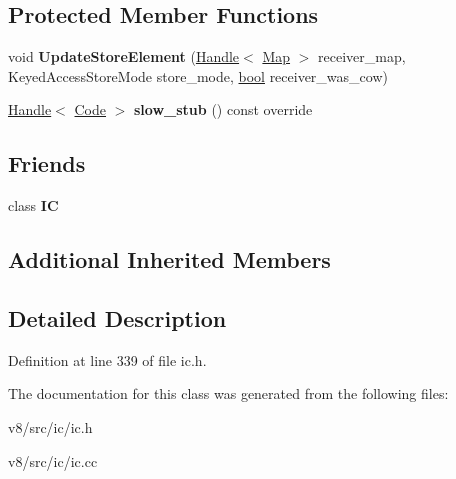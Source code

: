 \subsection*{Protected Member Functions}
\begin{DoxyCompactItemize}
\item 
\mbox{\label{classv8_1_1internal_1_1KeyedStoreIC_a23120f9a848981a9f087b81b207b6b61}} 
void {\bfseries Update\+Store\+Element} (\mbox{\hyperlink{classv8_1_1internal_1_1Handle}{Handle}}$<$ \mbox{\hyperlink{classv8_1_1internal_1_1Map}{Map}} $>$ receiver\+\_\+map, Keyed\+Access\+Store\+Mode store\+\_\+mode, \mbox{\hyperlink{classbool}{bool}} receiver\+\_\+was\+\_\+cow)
\item 
\mbox{\label{classv8_1_1internal_1_1KeyedStoreIC_abb1eca07d40010a519876eef4de13a00}} 
\mbox{\hyperlink{classv8_1_1internal_1_1Handle}{Handle}}$<$ \mbox{\hyperlink{classv8_1_1internal_1_1Code}{Code}} $>$ {\bfseries slow\+\_\+stub} () const override
\end{DoxyCompactItemize}
\subsection*{Friends}
\begin{DoxyCompactItemize}
\item 
\mbox{\label{classv8_1_1internal_1_1KeyedStoreIC_ae59e849648858af1fd22081890d47b78}} 
class {\bfseries IC}
\end{DoxyCompactItemize}
\subsection*{Additional Inherited Members}


\subsection{Detailed Description}


Definition at line 339 of file ic.\+h.



The documentation for this class was generated from the following files\+:\begin{DoxyCompactItemize}
\item 
v8/src/ic/ic.\+h\item 
v8/src/ic/ic.\+cc\end{DoxyCompactItemize}

